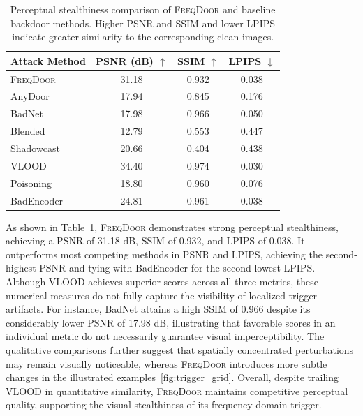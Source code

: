 \documentclass[lettersize,journal]{IEEEtran}
\begin{document}
\begin{table}[t]
\centering
\caption{Perceptual stealthiness comparison of \textsc{FreqDoor} and baseline backdoor methods. Higher PSNR and SSIM and lower LPIPS indicate greater similarity to the corresponding clean images.}
\label{tab:perceptual_stealthiness}
\scriptsize
\setlength{\tabcolsep}{4pt}
\begin{tabular}{@{}lccc@{}}
\toprule
\textbf{Attack Method} & \textbf{PSNR (dB)} $\uparrow$ & \textbf{SSIM} $\uparrow$ & \textbf{LPIPS} $\downarrow$ \\
\midrule
\textsc{FreqDoor} & 31.18 & 0.932 & 0.038 \\
AnyDoor~\cite{Lu2024AnyDoor} & 17.94 & 0.845 & 0.176 \\
BadNet~\cite{Gu2017BadNets} & 17.98 & 0.966 & 0.050 \\
Blended~\cite{Chen2017Blended} & 12.79 & 0.553 & 0.447 \\
Shadowcast~\cite{Xu2024Shadowcast} & 20.66 & 0.404 & 0.438 \\
VLOOD~\cite{Lyu2025VLOOD} & 34.40 & 0.974 & 0.030 \\
Poisoning~\cite{carlini2022iclr-poisoning} & 18.80 & 0.960 & 0.076 \\
BadEncoder~\cite{Jia2022BadEncoder} & 24.81 & 0.961 & 0.038 \\

\bottomrule
\end{tabular}
\end{table}

As shown in Table~\ref{tab:perceptual_stealthiness},
\textsc{FreqDoor} demonstrates strong perceptual stealthiness,
achieving a PSNR of 31.18 dB, SSIM of 0.932, and LPIPS of
0.038. It outperforms most competing methods in PSNR and
LPIPS, achieving the second-highest PSNR and tying with
BadEncoder for the second-lowest LPIPS. Although VLOOD
achieves superior scores across all three metrics, these
numerical measures do not fully capture the visibility of
localized trigger artifacts. For instance, BadNet attains
a high SSIM of 0.966 despite its considerably lower PSNR
of 17.98 dB, illustrating that favorable scores in an
individual metric do not necessarily guarantee visual
imperceptibility. The qualitative comparisons further
suggest that spatially concentrated perturbations may
remain visually noticeable, whereas \textsc{FreqDoor}
introduces more subtle changes in the illustrated examples~\ref{fig:trigger_grid}.
Overall, despite trailing VLOOD in quantitative similarity,
\textsc{FreqDoor} maintains competitive perceptual quality,
supporting the visual stealthiness of its frequency-domain
trigger.
\end{document}
